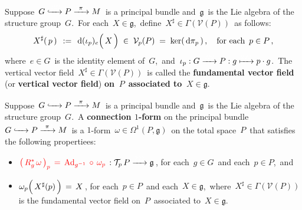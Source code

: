 \vskip 0.5cm
\begin{definition}
\mbox{}
\vskip -0.05cm
\noindent
Suppose
\,$G \xhookrightarrow{{\color{white}222}} P \xrightarrow{{\color{white}2}\pi{\color{white}2}} M$\,
is a principal bundle and
\,$\mathfrak{g}$\, is the Lie algebra of the structure group \,$G$.\,
For each \,$X \in \mathfrak{g}$,\, define \,$X^{\sharp} \in \Gamma(\mathcal{V}(P))$\, as follows:
\begin{equation*}
X^{\sharp}(\,p\,)
\;\, := \;\,
	\d(\iota_{p})_{e}\!\left(\,\overset{{\color{white}.}}{X}\,\right)
\; \in \;
	\mathcal{V}_{p}(P)
\; = \;
	\ker(\,\d\pi_{p}\,)\,,
\quad
\textnormal{for each \,$p \in P$}\,,
\end{equation*}
where \,$e \in G$\, is the identity element of \,$G$,\, and
\,$\iota_{p} : G \xrightarrow{{\color{white}222}} P : g \xmapsto{{\color{white}222}} p \cdot g$.\,
The vertical vector field \,$X^{\sharp} \in \Gamma(\mathcal{V}(P))$\, is  called the
\textbf{fundamental vector field} (or \textbf{vertical vector field})
\textbf{on \,$P$\,} \textbf{associated to \,$X \in \mathfrak{g}$}.\, 
\end{definition}


\vskip 0.5cm
\begin{definition}
\mbox{}
\vskip -0.05cm
\noindent
Suppose
\,$G \xhookrightarrow{{\color{white}222}} P \xrightarrow{{\color{white}2}\pi{\color{white}2}} M$\,
is a principal bundle and
\,$\mathfrak{g}$\, is the Lie algebra of the structure group \,$G$.\,
A \textbf{connection $1$-form} on the principal bundle
\,$G \xhookrightarrow{{\color{white}222}} P \xrightarrow{{\color{white}2}\pi{\color{white}2}} M$\,
is a $1$-form \,$\omega \in \Omega^{1}(P,\mathfrak{g})$\, on the total space \,$P$\, that satisfies
the following propertiees:
\begin{itemize}
\item
	$
	{\color{red}\left(\,R_{g}^{*}\,\omega\,\right)_{p}
	\,=\,
		\Ad_{g^{-1}} \,\circ\, \omega_{p}
		} \,:
		\mathcal{T}_{p}\,P \xrightarrow{{\color{white}222}} \mathfrak{g}$\,,\;
	for each \,$g \in G$\, and each \,$p \in P$,\, and
\item
	{\color{red}$\omega_{p}\!\left(\,\overset{{\color{white}.}}{X^{\sharp}(p)}\,\right) \,=\, X$}\,,\;
	for each \,$p \in P$\, and each \,$X \in \mathfrak{g}$,\,
	where \,$X^{\sharp} \in \Gamma(\mathcal{V}(P))$\, is the fundamental vector field
	on \,$P$\, associated to \,$X \in \mathfrak{g}$.\,
\end{itemize}
\end{definition}

